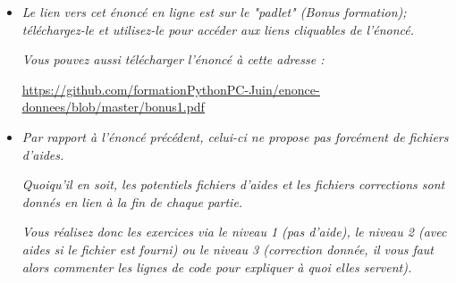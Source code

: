 \documentclass[11pt]{article}
\begin{document}
\begin{itemize}

\item \textit{Le lien vers cet énoncé en ligne est sur le "padlet" (Bonus formation); téléchargez-le et utilisez-le pour accéder aux liens cliquables de l'énoncé.}


\medskip

\textit{Vous pouvez aussi télécharger l'énoncé à cette adresse : }


\begin{center}
\underline{\url{https://github.com/formationPythonPC-Juin/enonce-donnees/blob/master/bonus1.pdf}                                                                                               }
\end{center}







\bigskip










\item \textit{Par rapport à l'énoncé précédent, celui-ci ne propose pas forcément  de fichiers d'aides.}

\medskip

\textit{Quoiqu'il en soit, les potentiels fichiers d'aides et les fichiers corrections sont donnés en lien à la fin de chaque partie.}

\medskip
\textit{Vous réalisez donc les exercices via le niveau 1 (pas d'aide), le niveau 2 (avec aides si le fichier est fourni) ou le niveau 3 (correction donnée, il vous faut alors commenter les lignes de code pour expliquer à quoi elles servent).} 








\bigskip














\end{itemize}
\end{document}
